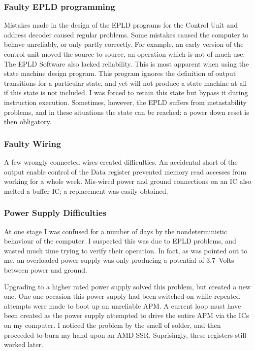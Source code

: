 \subsubsection{Faulty EPLD programming}
Mistakes made in the design of the EPLD programs for the Control Unit and address decoder caused regular problems. 
Some mistakes caused the computer to behave unreliably, or only partly correctly.
For example, an early version of the control unit moved the source to source, an operation which is not of much use.
The EPLD Software also lacked reliability. 
This is most apparent when using the state machine design program.
This program ignores the definition of  output transitions for a particular state, and yet will not produce a state machine at all if this state is not included.
I was forced to retain this state but bypass it during  instruction execution.
Sometimes, however, the EPLD suffers from metastability problems, and in these situations the state can be reached; a power down reset is then obligatory.

\subsubsection{Faulty Wiring}
A few wrongly connected wires created difficulties.
An accidental short of the output enable control of the Data register prevented memory read accesses from working for a whole week. 
Mis-wired power and ground connections on an IC also melted a buffer IC; a replacement
was easily obtained.

\subsubsection{Power Supply Difficulties}
At one stage I was confused for a number of days by the nondeterministic behaviour of the computer. 
I suspected this was due to EPLD problems, and wasted much time trying to verify their operation.
In fact, as was pointed out to me, an overloaded  power supply was only producing
a potential of 3.7~Volts between power and ground.

Upgrading to a higher rated power supply solved this problem, but created a new one.
One one occasion this power supply had been switched on while repeated attempts were made to boot up an unreliable APM. 
A current loop must have been created as the power supply attempted to drive the entire APM via the ICs on my computer.
I noticed the problem by the smell of solder, and then proceeded to burn my hand upon an AMD SSR. 
Suprisingly, these registers still worked later.


